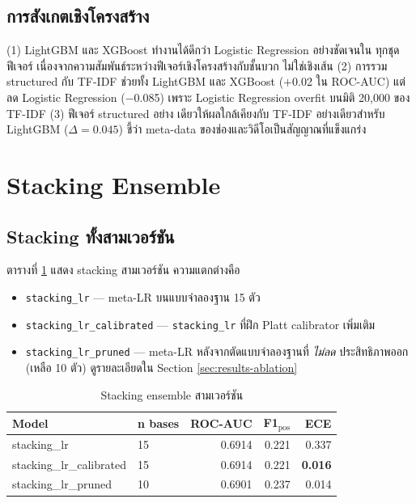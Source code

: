 \subsection{การสังเกตเชิงโครงสร้าง}

(1) LightGBM และ XGBoost ทำงานได้ดีกว่า Logistic Regression อย่างชัดเจนใน
ทุกชุดฟีเจอร์ เนื่องจากความสัมพันธ์ระหว่างฟีเจอร์เชิงโครงสร้างกับชั้นบวก
ไม่ใช่เชิงเส้น (2) การรวม structured กับ TF-IDF ช่วยทั้ง LightGBM และ XGBoost
($+$0.02 ใน ROC-AUC) แต่ลด Logistic Regression ($-$0.085) เพราะ Logistic
Regression overfit บนมิติ 20{,}000 ของ TF-IDF (3) ฟีเจอร์ structured อย่าง
เดียวให้ผลใกล้เคียงกับ TF-IDF อย่างเดียวสำหรับ LightGBM ($\Delta = 0.045$)
ชี้ว่า meta-data ของช่องและวิดีโอเป็นสัญญาณที่แข็งแกร่ง

\section{Stacking Ensemble}
\label{sec:results-stacking}

\subsection{Stacking ทั้งสามเวอร์ชัน}

ตารางที่ \ref{tab:stacking} แสดง stacking สามเวอร์ชัน ความแตกต่างคือ
\begin{itemize}[leftmargin=2em]
  \item \texttt{stacking\_lr} — meta-LR บนแบบจำลองฐาน 15 ตัว
  \item \texttt{stacking\_lr\_calibrated} — \texttt{stacking\_lr} ที่ฝึก Platt
        calibrator เพิ่มเติม
  \item \texttt{stacking\_lr\_pruned} — meta-LR หลังจากตัดแบบจำลองฐานที่
        \emph{ไม่ลด} ประสิทธิภาพออก (เหลือ 10 ตัว) ดูรายละเอียดใน Section
        \ref{sec:results-ablation}
\end{itemize}

\begin{table}[H]
\centering
\caption{Stacking ensemble สามเวอร์ชัน}
\label{tab:stacking}
\begin{tabularx}{\textwidth}{lXrrr}
\toprule
\textbf{Model} & \textbf{n bases} & \textbf{ROC-AUC} & \textbf{F1$_{\text{pos}}$} & \textbf{ECE} \\
\midrule
stacking\_lr              & 15 & 0.6914 & 0.221 & 0.337 \\
stacking\_lr\_calibrated  & 15 & 0.6914 & 0.221 & \textbf{0.016} \\
stacking\_lr\_pruned      & 10 & 0.6901 & 0.237 & 0.014 \\
\bottomrule
\end{tabularx}
\end{table}

